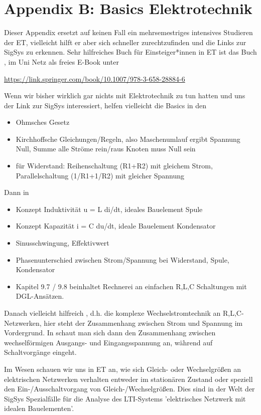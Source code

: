 \clearpage
\section{Appendix B: Basics Elektrotechnik}
%
Dieser Appendix ersetzt auf keinen Fall ein mehrsemestriges intensives Studieren
der ET, vielleicht hilft er aber sich schneller zurechtzufinden und die Links
zur SigSys zu erkennen.
%
Sehr hilfreiches Buch für Einsteiger*innen in ET ist das Buch
\cite{Marinescu2020}, im Uni Netz als freies E-Book unter

\url{https://link.springer.com/book/10.1007/978-3-658-28884-6}

Wenn wir bisher wirklich gar nichts mit Elektrotechnik zu tun hatten und uns
der Link zur SigSys interessiert, helfen vielleicht die Basics
in den \cite[Kapiteln 1-3]{Marinescu2020}
\begin{itemize}
  \item Ohmsches Gesetz
  \item Kirchhoffsche Gleichungen/Regeln, also Maschenumlauf ergibt Spannung Null,
  Summe alle Ströme rein/raus Knoten muss Null sein
  \item für Widerstand: Reihenschaltung (R1+R2) mit gleichem Strom,
  Parallelschaltung (1/R1+1/R2) mit gleicher Spannung
\end{itemize}
Dann in \cite[Kapitel 9]{Marinescu2020}
\begin{itemize}
\item Konzept Induktivität u = L di/dt, ideales Bauelement Spule
\item Konzept Kapazität i = C du/dt, ideale Bauelement Kondensator
\item Sinusschwingung, Effektivwert
\item Phasenunterschied zwischen Strom/Spannung bei Widerstand, Spule, Kondensator
\item Kapitel 9.7 / 9.8 beinhaltet Rechnerei an
einfachen R,L,C Schaltungen mit DGL-Ansätzen.
\end{itemize}
Danach vielleicht hilfreich \cite[Kap. 10.2 und 10.3]{Marinescu2020}, d.h.
die komplexe Wechselstromtechnik an R,L,C-Netzwerken, hier steht
der Zusammenhang zwischen Strom und Spannung im Vordergrund.
In \cite[Kap. 13]{Marinescu2020} schaut man sich dann den Zusammenhang zwischen
wechselförmigen Ausgangs- und Eingangsspannung an, während
\cite[Kap. 15]{Marinescu2020} auf Schaltvorgänge eingeht.

Im Wesen schauen wir uns in ET an, wie sich Gleich- oder Wechselgrößen
an elektrischen Netzwerken verhalten entweder im stationären Zustand
oder speziell den Ein-/Ausschaltvorgang von Gleich-/Wechselgrößen.
%
Dies sind in der Welt der SigSys Spezialfälle für die Analyse des LTI-Systems
'elektrisches Netzwerk mit idealen Bauelementen'.

